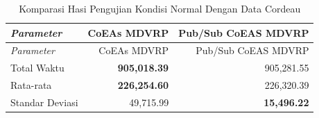 \begin{longtable}[!]{lrr}
	\caption{Komparasi Hasi Pengujian Kondisi Normal Dengan Data Cordeau}
	\label{tbl:test_result_normal_cordeau_comparison}\\
	\toprule
		\textit{Parameter} & CoEAs MDVRP  & Pub/Sub CoEAS MDVRP\\ 
	\midrule
	\endfirsthead
	\toprule
		\textit{Parameter} & CoEAs MDVRP  & Pub/Sub CoEAS MDVRP\\ 
	\midrule
	\endhead
	\bottomrule
	\endfoot
		Total Waktu & \textbf{905,018.39} & 905,281.55\\
		Rata-rata & \textbf{226,254.60} & 226,320.39\\
		Standar Deviasi & 49,715.99 & \textbf{15,496.22}\\
\end{longtable}


